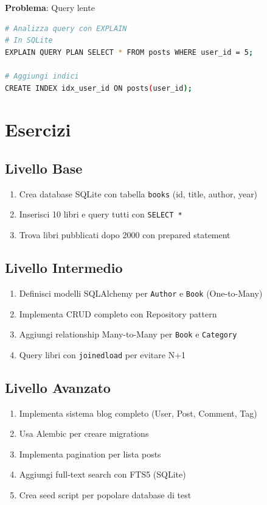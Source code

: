 \textbf{Problema}: Query lente
\begin{lstlisting}[language=bash]
# Analizza query con EXPLAIN
# In SQLite
EXPLAIN QUERY PLAN SELECT * FROM posts WHERE user_id = 5;

# Aggiungi indici
CREATE INDEX idx_user_id ON posts(user_id);
\end{lstlisting}

\section{Esercizi}

\subsection{Livello Base}
\begin{enumerate}
  \item Crea database SQLite con tabella \texttt{books} (id, title, author, year)
  \item Inserisci 10 libri e query tutti con \texttt{SELECT *}
  \item Trova libri pubblicati dopo 2000 con prepared statement
\end{enumerate}

\subsection{Livello Intermedio}
\begin{enumerate}
  \item Definisci modelli SQLAlchemy per \texttt{Author} e \texttt{Book} (One-to-Many)
  \item Implementa CRUD completo con Repository pattern
  \item Aggiungi relationship Many-to-Many per \texttt{Book} e \texttt{Category}
  \item Query libri con \texttt{joinedload} per evitare N+1
\end{enumerate}

\subsection{Livello Avanzato}
\begin{enumerate}
  \item Implementa sistema blog completo (User, Post, Comment, Tag)
  \item Usa Alembic per creare migrations
  \item Implementa pagination per lista posts
  \item Aggiungi full-text search con FTS5 (SQLite)
  \item Crea seed script per popolare database di test
\end{enumerate}

